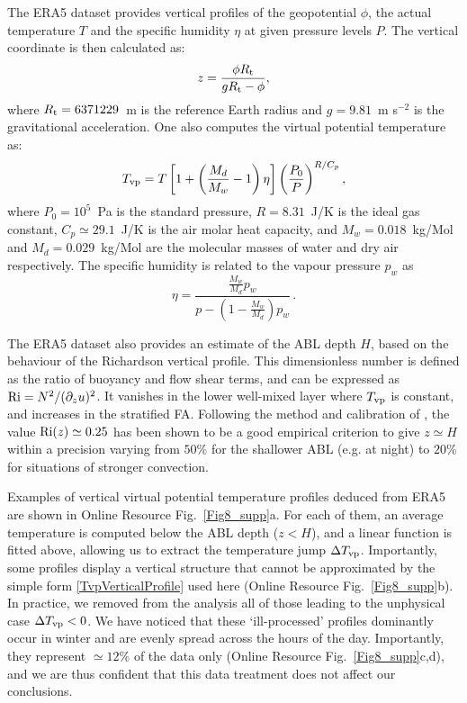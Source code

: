 The ERA5 dataset provides vertical profiles of the geopotential $\phi$, the actual temperature $T$ and the specific humidity $\eta$ at given pressure levels $P$. The vertical coordinate is then calculated as:
%
\begin{equation}
z = \frac{\phi R_{\textup{t}}}{g R_{\textup{t}} - \phi},
\end{equation}
%
where $R_{\textup{t}} = 6371229$~m is the reference Earth radius and $g = 9.81$~m s$^{-2}$ is the gravitational acceleration. One also computes the virtual potential temperature as:
%
\begin{equation}
T_{\textup{vp}} = T\left[1 + \left(\frac{M_d}{M_w} - 1\right) \eta \right] \left(\frac{P_{0}}{P}\right)^{R/C_p},
\end{equation}
%
where $P_{0} = 10^{5}$~Pa is the standard pressure, $R = 8.31$~J/K is the ideal gas constant, $C_p \simeq 29.1$~J/K is the air molar heat capacity, and $M_w = 0.018$~kg/Mol and $M_d = 0.029$~kg/Mol are the molecular masses of water and dry air respectively. The specific humidity is related to the vapour pressure $p_w$ as
%
\begin{equation}
\eta = \frac{\frac{M_w}{M_d} p_w}{p - \left( 1 - \frac{M_w}{M_d} \right) p_w} \, .
\end{equation}
%

The ERA5 dataset also provides an estimate of the ABL depth $H$, based on the behaviour of the Richardson vertical profile. This dimensionless number is defined as the ratio of buoyancy and flow shear terms, and can be expressed as $\textup{Ri} = N^2/(\partial_z u)^2$. It vanishes in the lower well-mixed layer where $T_{\textup{vp}}$ is constant, and increases in the stratified FA. Following the method and calibration of \citet{Vogelezang1996,seidel2012}, the value $\textup{Ri}(z) \simeq 0.25$ has been shown to be a good empirical criterion to give $z \simeq H$ within a precision varying from $50$\% for the shallower ABL (e.g. at night) to $20$\% for situations of stronger convection.

Examples of vertical virtual potential temperature profiles deduced from ERA5 are shown in Online Resource Fig.~\ref{Fig8_supp}a. For each of them, an average temperature is computed below the ABL depth ($z<H$), and a linear function is fitted above, allowing us to extract the temperature jump $\Delta T_{\textup{vp}}$. Importantly, some profiles display a vertical structure that cannot be approximated by the simple form \eqref{TvpVerticalProfile} used here (Online Resource Fig.~\ref{Fig8_supp}b). In practice, we removed from the analysis all of those leading to the unphysical case $\Delta T_{\textup{vp}}<0$. We have noticed that these `ill-processed' profiles dominantly occur in winter and are evenly spread across the hours of the day. Importantly, they represent $\simeq12$\% of the data only (Online Resource Fig.~\ref{Fig8_supp}c,d), and we are thus confident that this data treatment does not affect our conclusions.

